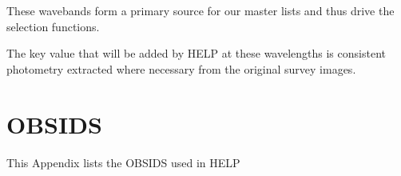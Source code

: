 \documentclass[usenatbib]{mnras}
\begin{document}
These wavebands form a primary source for our master lists and thus drive the
selection functions.

The key value that will be added by HELP at these wavelengths is consistent
photometry extracted where necessary from the original survey images.

%   






\section{OBSIDS}

This Appendix lists the OBSIDS used in HELP


\end{document}
